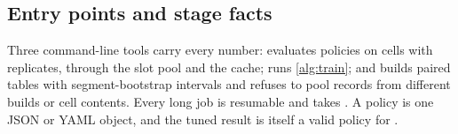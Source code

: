 
\subsection{Entry points and stage facts}

Three command-line tools carry every number:  evaluates policies on cells with
replicates, through the slot pool and the cache;  runs \cref{alg:train}; and
 builds paired tables with segment-bootstrap intervals and refuses to pool records
from different builds or cell contents. Every long job is resumable and takes
. A policy is one JSON or YAML object, and the tuned result
 is itself a valid policy for .

